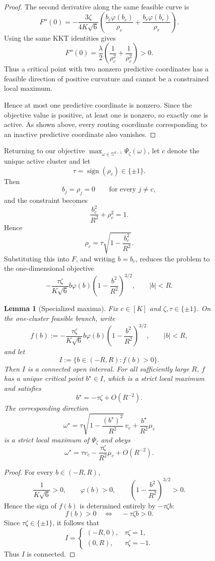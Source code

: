 \documentclass{article}
\newtheorem{lemma}[lemma]{Lemma}
\begin{document}
\begin{figure}
\begin{proof}
The second derivative along the same feasible curve is
\[
    F''(0)
    =
    -\frac{3\zeta}{4K\sqrt6}
    \left(
        \frac{b_c\varphi(b_c)}{\rho_c}
        +
        \frac{b_r\varphi(b_r)}{\rho_r}
    \right).
\]
Using the same KKT identities gives
\[
    F''(0)
    =
    \frac{\lambda}{2}
    \left(
        \frac{1}{\rho_c^2}
        +
        \frac{1}{\rho_r^2}
    \right)
    >0.
\]
Thus a critical point with two nonzero predictive coordinates has a feasible
direction of positive curvature and cannot be a constrained local maximum.

Hence at most one predictive coordinate is nonzero. Since the objective
value is positive, at least one is nonzero, so exactly one is active. As
shown above, every routing coordinate corresponding to an inactive predictive
coordinate also vanishes.
\end{proof}

Returning to our objective $\max_{\omega \in \mathbb{S}^{d-1}} \Psi_{\zeta}(\omega)$, let $c$ denote the unique active cluster and let
\[
    \tau=\operatorname{sign}(\rho_c)\in\{\pm1\}.
\]
Then
\[
    b_j=\rho_j=0
    \qquad
    \text{for every }j\neq c,
\]
and the constraint becomes
\[
    \frac{b_c^2}{R^2}+\rho_c^2=1.
\]
Hence
\[
    \rho_c
    =
    \tau\sqrt{1-\frac{b_c^2}{R^2}}.
\]
Substituting this into $F$, and writing $b=b_c$, reduces the problem to the
one-dimensional objective
\[
    -\frac{\tau\zeta}{K\sqrt6}
    b\varphi(b)
    \left(1-\frac{b^2}{R^2}\right)^{3/2},
    \qquad
    |b|<R.
\]


\begin{lemma}[Specialized maxima]
\label{lem:specialized-maxima}
Fix $c\in[K]$ and $\zeta,\tau\in\{\pm1\}$. On the one-cluster feasible branch,
write
\[
    f(b)
    :=
    -\frac{\tau\zeta}{K\sqrt6}
    b\varphi(b)
    \left(1-\frac{b^2}{R^2}\right)^{3/2},
    \qquad |b|<R,
\]
and let
\[
    I:=\{b\in(-R,R):f(b)>0\}.
\]
Then $I$ is a connected open interval. For all sufficiently large $R$, $f$
has a unique critical point $b^\star\in I$, which is a strict local maximum
and satisfies
\[
    b^\star=-\tau\zeta+O(R^{-2}).
\]
The corresponding direction
\[
    \omega^\star
    =
    \tau\sqrt{1-\frac{(b^\star)^2}{R^2}}\,v_c
    +
    \frac{b^\star}{R^2}\mu_c
\]
is a strict local maximum of $\Psi_\zeta$ and obeys
\[
    \omega^\star
    =
    \tau v_c
    -
    \frac{\tau\zeta}{R^2}\mu_c
    +
    O(R^{-2}).
\]
\end{lemma}

\begin{proof}
For every $b\in(-R,R)$,
\[
    \frac{1}{K\sqrt6}>0,
    \qquad
    \varphi(b)>0,
    \qquad
    \left(1-\frac{b^2}{R^2}\right)^{3/2}>0.
\]
Hence the sign of $f(b)$ is determined entirely by $-\tau\zeta b$:
\[
    f(b)>0
    \quad\Longleftrightarrow\quad
    -\tau\zeta b>0.
\]
Since $\tau\zeta\in\{\pm1\}$, it follows that
\[
    I=
    \begin{cases}
        (-R,0), & \tau\zeta=1,\\
        (0,R), & \tau\zeta=-1.
    \end{cases}
\]
Thus $I$ is connected.


\end{proof}
\end{figure}
\end{document}
